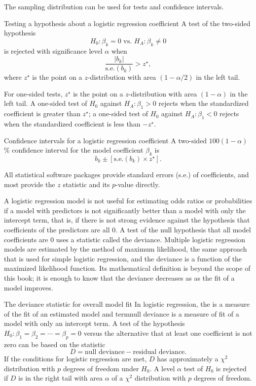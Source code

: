 The sampling distribution can be used for tests and confidence intervals.

\begin{onebox}{Testing a hypothesis about a logistic regression coefficient}
A test of the two-sided hypothesis
\[
  H_0: \beta_k = 0 \text{ vs. } H_A: \beta_k \ne 0
\]
is rejected with significance level $\alpha$ when
\[
     \frac{|b_k|}{\textrm{s.e.}(b_k)} > z^\star,
\]
where $z^\star$ is the point on a $z$-distribution with area $(1 - \alpha/2)$ in the left tail.
\end{onebox}

For one-sided tests, $z^\star$ is the point on a $z$-distribution with area $(1 - \alpha)$ in the left tail. A one-sided test of $H_0$ against $H_A: \beta_1 > 0$ rejects when the standardized coefficient is greater than  $ z^\star$; a one-sided test of $H_0$ against $H_A: \beta_1 < 0$  rejects when the standardized coefficient is less than $-z^\star$.

\begin{onebox}{Confidence intervals for a logistic regression coefficient}
A two-sided $100(1 - \alpha)$\% confidence interval for the model coefficient $\beta_k$ is
\[
  b_k \pm [{\textrm{s.e.}(b_k)} \times z^\star].
\]
\end{onebox}

All statistical software packages provide standard errors (s.e.) of coefficients, and most provide the $z$ statistic and its $p$-value directly.

A logistic regression model is not useful for estimating odds ratios or probabilities if a model with predictors is not significantly better than a model with only the intercept term, that is, if there is not strong evidence against the hypothesis that coefficients of the predictors are all 0.  A test of the null hypothesis that all model coefficients are 0  uses a statistic called the deviance. Multiple logistic regression models are estimated by the method of maximum likelihood, the same approach that is used for simple logistic regression, and the deviance is a function of the maximized likelihood function.  Its mathematical definition is beyond the scope of this book; it is enough to know that the deviance decreases as as the fit of a model improves.

\begin{onebox}{The deviance statistic for overall model fit}
  In logistic regression, the  is a measure of the fit of an estimated model and term{null deviance} is a measure of fit of a model with only an intercept term. A test of the hypothesis $H_0:\beta_1 = \beta_2 = \cdots = \beta_p = 0$ versus the alternative that at least one coefficient is not zero can be based on the statistic
  \[
    D =  \text{null deviance} - \text{residual deviance}.
  \]
  If the conditions for logistic regression are met, $D$ has approximately a $\chi^2$ distribution with $p$ degrees of freedom under $H_0$.  A level $\alpha$ test of $H_0$ is rejected if $D$ is in the right tail with area $\alpha$ of a $\chi^2$ distribution with $p$ degrees of freedom.
\end{onebox}

